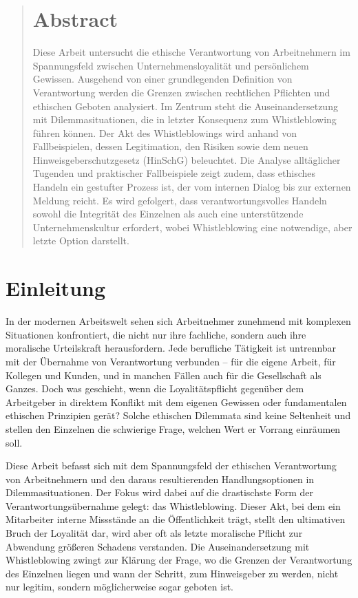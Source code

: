 \documentclass[
    12pt,               %
    a4paper,            %
    ngerman             %
]{scrartcl}
\begin{document}
\begin{abstract}
    \noindent
    \section*{Abstract}
    Diese Arbeit untersucht die ethische Verantwortung von Arbeitnehmern im Spannungsfeld zwischen Unternehmensloyalität und persönlichem Gewissen. Ausgehend von einer grundlegenden Definition von Verantwortung werden die Grenzen zwischen rechtlichen Pflichten und ethischen Geboten analysiert. Im Zentrum steht die Auseinandersetzung mit Dilemmasituationen, die in letzter Konsequenz zum Whistleblowing führen können. Der Akt des Whistleblowings wird anhand von Fallbeispielen, dessen Legitimation, den Risiken sowie dem neuen Hinweisgeberschutzgesetz (HinSchG) beleuchtet. Die Analyse alltäglicher Tugenden und praktischer Fallbeispiele zeigt zudem, dass ethisches Handeln ein gestufter Prozess ist, der vom internen Dialog bis zur externen Meldung reicht. Es wird gefolgert, dass verantwortungsvolles Handeln sowohl die Integrität des Einzelnen als auch eine unterstützende Unternehmenskultur erfordert, wobei Whistleblowing eine notwendige, aber letzte Option darstellt.
\end{abstract}

\newpage 
\tableofcontents
\newpage 

\section{Einleitung}
In der modernen Arbeitswelt sehen sich Arbeitnehmer zunehmend mit komplexen Situationen konfrontiert, die nicht nur ihre fachliche, sondern auch ihre moralische Urteilskraft herausfordern. Jede berufliche Tätigkeit ist untrennbar mit der Übernahme von Verantwortung verbunden – für die eigene Arbeit, für Kollegen und Kunden, und in manchen Fällen auch für die Gesellschaft als Ganzes. Doch was geschieht, wenn die Loyalitätspflicht gegenüber dem Arbeitgeber in direktem Konflikt mit dem eigenen Gewissen oder fundamentalen ethischen Prinzipien gerät? Solche ethischen Dilemmata sind keine Seltenheit und stellen den Einzelnen die schwierige Frage, welchen Wert er Vorrang einräumen soll.

%

Diese Arbeit befasst sich mit dem Spannungsfeld der ethischen Verantwortung von Arbeitnehmern und den daraus resultierenden Handlungsoptionen in Dilemmasituationen. Der Fokus wird dabei auf die drastischste Form der Verantwortungsübernahme gelegt: das Whistleblowing. Dieser Akt, bei dem ein Mitarbeiter interne Missstände an die Öffentlichkeit trägt, stellt den ultimativen Bruch der Loyalität dar, wird aber oft als letzte moralische Pflicht zur Abwendung größeren Schadens verstanden. Die Auseinandersetzung mit Whistleblowing zwingt zur Klärung der Frage, wo die Grenzen der Verantwortung des Einzelnen liegen und wann der Schritt, zum Hinweisgeber zu werden, nicht nur legitim, sondern möglicherweise sogar geboten ist.
\end{document}
